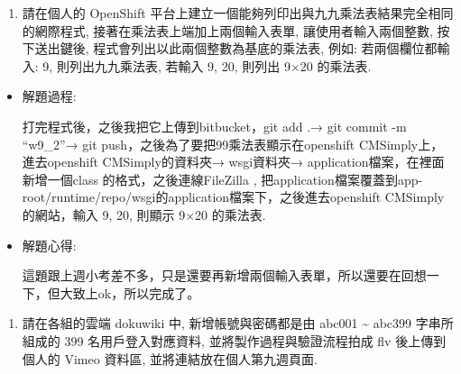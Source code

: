 \documentclass[]{article}
\begin{document}
\begin{enumerate}
\def\labelenumi{\arabic{enumi}.}
\setcounter{enumi}{1}
\itemsep1pt\parskip0pt
\item
  請在個人的 OpenShift
  平台上建立一個能夠列印出與九九乘法表結果完全相同的網際程式,
  接著在乘法表上端加上兩個輸入表單, 讓使用者輸入兩個整數, 按下送出鍵後,
  程式會列出以此兩個整數為基底的乘法表, 例如: 若兩個欄位都輸入: 9,
  則列出九九乘法表, 若輸入 9, 20, 則列出 9×20 的乘法表.
\end{enumerate}

\begin{itemize}
\item
  解題過程:

  打完程式後，之後我把它上傳到bitbucket，git add .→ git commit -m
  ``w9\_2''→ git push，之後為了要把99乘法表顯示在openshift
  CMSimply上，進去openshift CMSimply的資料夾→ wsgi資料夾→
  application檔案，在裡面新增一個class 的格式，之後連線FileZilla ,
  把application檔案覆蓋到app-root/runtime/repo/wsgi的application檔案下，之後進去openshift
  CMSimply的網站，輸入 9, 20, 則顯示 9×20 的乘法表.
\item
  解題心得:

  這題跟上週小考差不多，只是還要再新增兩個輸入表單，所以還要在回想一下，但大致上ok，所以完成了。
\end{itemize}

\begin{enumerate}
\def\labelenumi{\arabic{enumi}.}
\setcounter{enumi}{2}
\itemsep1pt\parskip0pt
\item
  請在各組的雲端 dokuwiki 中, 新增帳號與密碼都是由 abc001
  \textasciitilde{} abc399 字串所組成的 399 名用戶登入對應資料,
  並將製作過程與驗證流程拍成 flv 後上傳到個人的 Vimeo 資料區,
  並將連結放在個人第九週頁面.
\end{enumerate}
\end{document}
